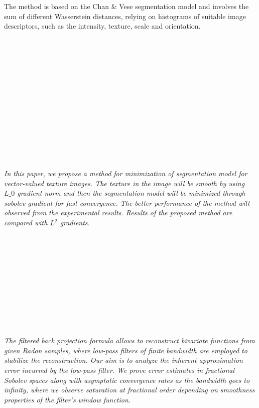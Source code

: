 \begin{multicols}{2}
{ The method is based on the Chan \& Vese segmentation model and involves the sum of different Wasserstein distances, relying on histograms of suitable image descriptors, such as the intensity, texture, scale and orientation.}\\
\\ 
        \\
        \\\\
        \\
        \\\\
        \\
        \\\\
        \\
        \\\\
\\
      \textit{In this paper, we propose a method for minimization of segmentation model for vector-valued texture images. The texture in the image will be smooth by using $L\_0$ gradient norm and then the segmentation model will be minimized through sobolev gradient for fast convergence. The better performance of the method will observed from the experimental results. Results of the proposed method are compared with $L^2$ gradients.}\\
\\ 
        \\
        \\\\
        \\
        \\\\
        \\
        \\\\
\\
      \textit{The filtered back projection formula allows to reconstruct bivariate functions from given Radon samples, where low-pass filters of finite bandwidth are employed to stabilize the reconstruction. Our aim is to analyze the inherent approximation error incurred by the low-pass filter. We prove error estimates in fractional Sobolev spaces along with asymptotic convergence rates as the bandwidth goes to infinity, where we observe saturation at fractional order depending on smoothness properties of the filter's window function.}\\

\end{multicols}
